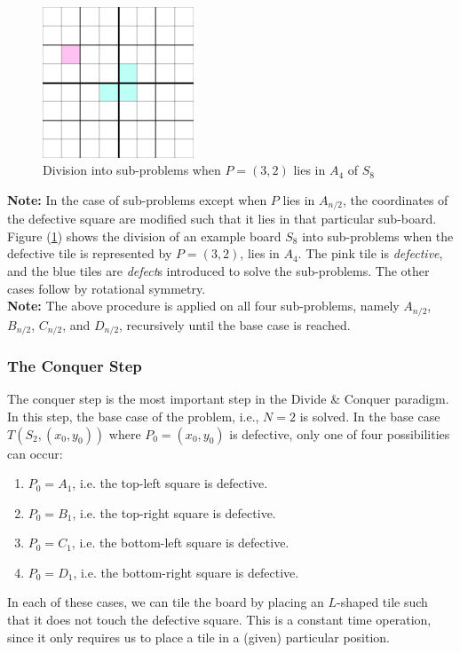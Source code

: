 \documentclass[12pt]{report}
\begin{document}
    \begin{figure}[htp]
        \begin{center}
            \includegraphics[width=0.40\textwidth]{divide-2.png}
        \end{center}
        \caption{Division into sub-problems when $P = (3, 2)$ lies in $A_{4}$ of $S_{8}$}
        \label{fig:example}
    \end{figure}
    \textbf{Note:}
    In the case of sub-problems except when $P$ lies in $A_{n/2}$, the coordinates of the
    defective square are modified such that it lies in that particular sub-board.
    \vspace*{10pt} \\
    Figure (\ref{fig:example}) shows the division of an example board $S_{8}$ into sub-problems when the defective tile is
    represented by $P = (3, 2)$, lies in $A_{4}$.
    The pink tile is \textit{defective}, and the blue tiles are \textit{defect}s introduced to solve the sub-problems.
    The other cases follow by rotational symmetry.
    \vspace*{10pt} \\
    \textbf{Note:} The above procedure is applied on all four sub-problems, namely $A_{n/2}$, $B_{n/2}$, $C_{n/2}$, and $D_{n/2}$,
    recursively until the base case is reached.

    \subsubsection*{The Conquer Step}
    The conquer step is the most important step in the Divide \& Conquer paradigm.
    In this step, the base case of the problem, i.e., $N = 2$ is solved.
    In the base case $T(S_{2}, (x_{0}, y_{0}))$ where $P_{0} = (x_{0}, y_{0})$ is defective, only one of four possibilities can occur:
    \begin{enumerate}
        \item $P_{0} = A_{1}$, i.e. the top-left square is defective.
        \item $P_{0} = B_{1}$, i.e. the top-right square is defective.
        \item $P_{0} = C_{1}$, i.e. the bottom-left square is defective.
        \item $P_{0} = D_{1}$, i.e. the bottom-right square is defective.
    \end{enumerate}
    In each of these cases, we can tile the board by placing an $L$-shaped tile such that it does not touch the defective square.
    This is a constant time operation, since it only requires us to place a tile in a (given) particular position.
\end{document}
